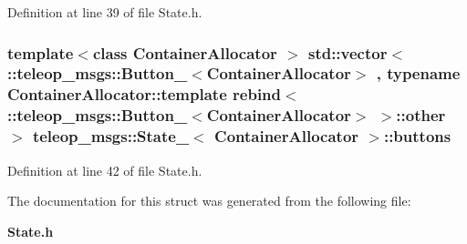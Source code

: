 Definition at line 39 of file State.h.

\subsubsection[{buttons}]{\setlength{\rightskip}{0pt plus 5cm}template$<$class ContainerAllocator $>$ std::vector$<$ ::{\bf teleop\_\-msgs::Button\_\-}$<$ContainerAllocator$>$ , typename ContainerAllocator::template rebind$<$ ::{\bf teleop\_\-msgs::Button\_\-}$<$ContainerAllocator$>$ $>$::other $>$ {\bf teleop\_\-msgs::State\_\-}$<$ ContainerAllocator $>$::{\bf buttons}}\label{structteleop__msgs_1_1State___ae70aec395eff33e08c0275256b0acf46}


Definition at line 42 of file State.h.



The documentation for this struct was generated from the following file:\begin{DoxyCompactItemize}
\item 
{\bf State.h}\end{DoxyCompactItemize}
